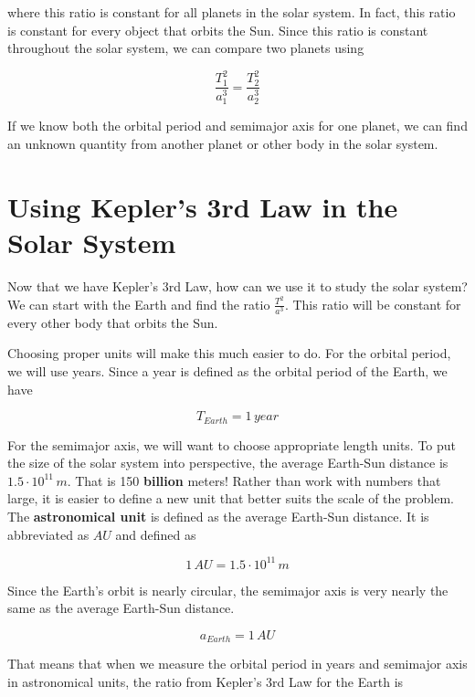 \documentclass[12pt]{book}
\begin{document}
where this ratio is constant for all planets in the solar system. In fact, this ratio is constant for every object that orbits the Sun. Since this ratio is constant throughout the solar system, we can compare two planets using

\begin{equation}
\frac{T_1^2}{a_1^3} = \frac{T_2^2}{a_2^3}
\end{equation}

If we know both the orbital period and semimajor axis for one planet, we can find an unknown quantity from another planet or other body in the solar system.

\section{Using Kepler's 3rd Law in the Solar System}

Now that we have Kepler's 3rd Law, how can we use it to study the solar system? We can start with the Earth and find the ratio $\frac{T^2}{a^3}$. This ratio will be constant for every other body that orbits the Sun.

Choosing proper units will make this much easier to do. For the orbital period, we will use years. Since a year is defined as the orbital period of the Earth, we have

\begin{equation}
T_{Earth} = 1 \, year
\end{equation} 

For the semimajor axis, we will want to choose appropriate length units. To put the size of the solar system into perspective, the average Earth-Sun distance is $1.5 \cdot 10^{11} \, m$. That is 150 \textbf{billion} meters! Rather than work with numbers that large, it is easier to define a new unit that better suits the scale of the problem. The \textbf{astronomical unit} is defined as the average Earth-Sun distance. It is abbreviated as $AU$ and defined as

\begin{equation}
1 \, AU = 1.5 \cdot 10^{11} \, m
\end{equation}

Since the Earth's orbit is nearly circular, the semimajor axis is very nearly the same as the average Earth-Sun distance.

\begin{equation}
a_{Earth} = 1 \, AU
\end{equation}

That means that when we measure the orbital period in years and semimajor axis in astronomical units, the ratio from Kepler's 3rd Law for the Earth is
\end{document}
